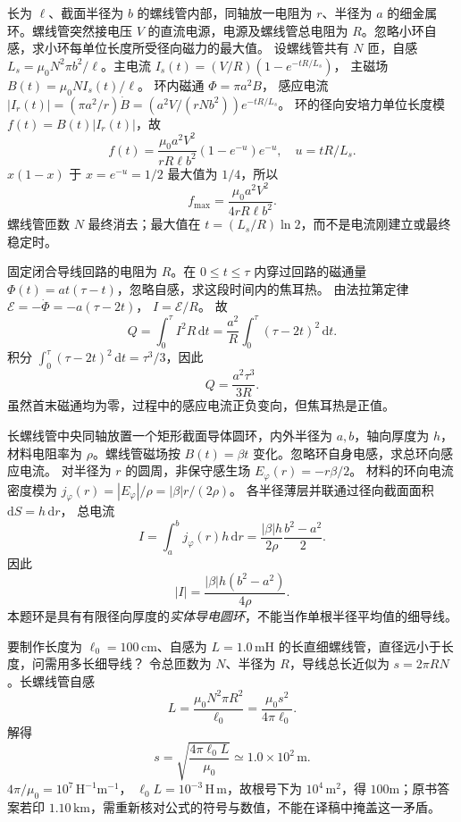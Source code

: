 长为 $\ell$、截面半径为 $b$ 的螺线管内部，同轴放一电阻为 $r$、半径为 $a$ 的细金属环。螺线管突然接电压 $V$ 的直流电源，电源及螺线管总电阻为 $R$。忽略小环自感，求小环每单位长度所受径向磁力的最大值。
\exsolution
设螺线管共有 $N$ 匝，自感
$L_s=\mu_0N^2\pi b^2/\ell$。主电流
$I_s(t)=(V/R)(1-e^{-tR/L_s})$，
主磁场
$B(t)=\mu_0NI_s(t)/\ell$。
环内磁通 $\Phi=\pi a^2B$，
感应电流
$|I_r(t)|=(\pi a^2/r)\dot B
=(a^2V/(rNb^2))e^{-tR/L_s}$。
环的径向安培力单位长度模
$f(t)=B(t)|I_r(t)|$，故
\[
f(t)=\frac{\mu_0a^2V^2}{rR\ell b^2}
(1-e^{-u})e^{-u},\quad u=tR/L_s.
\]
$x(1-x)$ 于 $x=e^{-u}=1/2$ 最大值为 $1/4$，所以
\[
\boxed{f_{\max}=\frac{\mu_0a^2V^2}{4rR\ell b^2}}.
\]
\excheck 螺线管匝数 $N$ 最终消去；最大值在 $t=(L_s/R)\ln2$，而不是电流刚建立或最终稳定时。

固定闭合导线回路的电阻为 $R$。在 $0\le t\le\tau$ 内穿过回路的磁通量
$\Phi(t)=at(\tau-t)$，忽略自感，求这段时间内的焦耳热。
\exsolution
由法拉第定律
$\mathcal E=-\dot\Phi=-a(\tau-2t)$，
$I=\mathcal E/R$。
故
\[
Q=\int_0^\tau I^2R\,\mathrm dt
=\frac{a^2}R\int_0^\tau(\tau-2t)^2\,\mathrm dt.
\]
积分
$\int_0^\tau(\tau-2t)^2\,\mathrm dt=\tau^3/3$，因此
\[
\boxed{Q=\frac{a^2\tau^3}{3R}}.
\]
\excheck 虽然首末磁通均为零，过程中的感应电流正负变向，但焦耳热是正值。

长螺线管中央同轴放置一个矩形截面导体圆环，内外半径为 $a,b$，轴向厚度为 $h$，材料电阻率为 $\rho$。螺线管磁场按 $B(t)=\beta t$ 变化。忽略环自身电感，求总环向感应电流。
\exsolution
对半径为 $r$ 的圆周，非保守感生场
$E_\varphi(r)=-r\beta/2$。
材料的环向电流密度模为
$j_\varphi(r)=|E_\varphi|/\rho=|\beta|r/(2\rho)$。
各半径薄层并联通过径向截面面积
$\mathrm dS=h\,\mathrm dr$，
总电流
\[
I=\int_a^bj_\varphi(r)h\,\mathrm dr
=\frac{|\beta|h}{2\rho}\frac{b^2-a^2}{2}.
\]
因此
\[
\boxed{|I|=\frac{|\beta|h(b^2-a^2)}{4\rho}}.
\]
\excheck 本题环是具有有限径向厚度的\emph{实体导电圆环}，不能当作单根半径平均值的细导线。

要制作长度为 $\ell_0=100\,\mathrm{cm}$、自感为 $L=1.0\,\mathrm{mH}$ 的长直细螺线管，直径远小于长度，问需用多长细导线？
\exsolution
令总匝数为 $N$、半径为 $R$，导线总长近似为 $s=2\pi RN$。长螺线管自感
\[
L=\frac{\mu_0N^2\pi R^2}{\ell_0}
=\frac{\mu_0s^2}{4\pi\ell_0}.
\]
解得
\[
\boxed{s=\sqrt{\frac{4\pi\ell_0L}{\mu_0}}
\simeq1.0\times10^2\,\mathrm m}.
\]
\excheck $4\pi/\mu_0=10^7\,\mathrm{H^{-1}m^{-1}}$，
$\ell_0L=10^{-3}\,\mathrm{H\,m}$，故根号下为 $10^4\,\mathrm{m^2}$，得 $100$m；原书答案若印 $1.10\,\mathrm{km}$，需重新核对公式的符号与数值，不能在译稿中掩盖这一矛盾。

